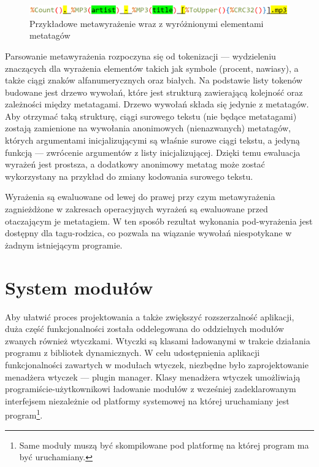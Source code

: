 \begin{figure}
\begin{center}
\includegraphics[scale=0.55]{img/metatag_expr.png}
\end{center}
\caption{Przykładowe metawyrażenie wraz z wyróżnionymi elementami metatagów}
\end{figure}

\par
Parsowanie metawyrażenia rozpoczyna się od tokenizacji --- wydzieleniu znaczących dla wyrażenia elementów takich jak symbole (procent, nawiasy), a także ciągi znaków alfanumerycznych oraz białych. Na podstawie listy tokenów budowane jest drzewo wywołań, które jest strukturą zawierającą kolejność oraz zależności między metatagami.
Drzewo wywołań składa się jedynie z metatagów. Aby otrzymać taką strukturę, ciągi surowego tekstu (nie będące metatagami) zostają zamienione na wywołania anonimowych (nienazwanych) metatagów, których argumentami inicjalizującymi są właśnie surowe ciągi tekstu, a jedyną funkcją --- zwrócenie argumentów z listy inicjalizującej. Dzięki temu ewaluacja wyrażeń jest prostsza, a dodatkowy anonimowy metatag może zostać wykorzystany na przykład do zmiany kodowania surowego tekstu.
\par
Wyrażenia są ewaluowane od lewej do prawej przy czym metawyrażenia zagnieżdżone w zakresach operacyjnych wyrażeń są ewaluowane przed otaczającym je metatagiem. W ten sposób rezultat wykonania pod-wyrażenia jest dostępny dla tagu-rodzica, co pozwala na wiązanie wywołań niespotykane w żadnym istniejącym programie.

\section{System modułów}
\par
Aby ułatwić proces projektowania a także zwiększyć rozszerzalność aplikacji, duża część funkcjonalności została oddelegowana do oddzielnych modułów zwanych również wtyczkami.
Wtyczki są klasami ładowanymi w trakcie działania programu z bibliotek dynamicznych.
W celu udostępnienia aplikacji funkcjonalności zawartych w modułach wtyczek, niezbędne było zaprojektowanie menadżera wtyczek --- plugin manager.
Klasy menadżera wtyczek umożliwiają programiście-użytkownikowi ładowanie modułów z wcześniej zadeklarowanym interfejsem niezależnie od platformy systemowej na której uruchamiany jest program\footnote{Same moduły muszą być skompilowane pod platformę na której program ma być uruchamiany.}.

